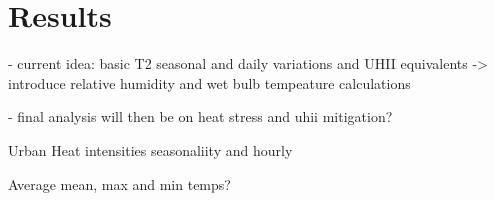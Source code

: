 \section{Results}






- current idea: basic T2 seasonal and daily variations and UHII equivalents -> introduce relative humidity and wet bulb tempeature calculations

- final analysis will then be on heat stress and uhii mitigation?



Urban Heat intensities seasonaliity and hourly

Average mean, max and min temps?
